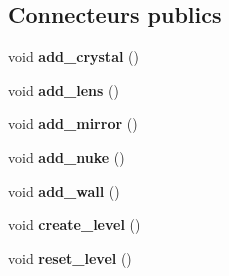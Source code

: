 \subsection*{Connecteurs publics}
\begin{DoxyCompactItemize}
\item 
\hypertarget{classElements_a964576c05a5b9ec733a663474f8fd978}{void {\bfseries add\+\_\+crystal} ()}\label{classElements_a964576c05a5b9ec733a663474f8fd978}

\item 
\hypertarget{classElements_a8093eca3330566813da371aecc96530c}{void {\bfseries add\+\_\+lens} ()}\label{classElements_a8093eca3330566813da371aecc96530c}

\item 
\hypertarget{classElements_a8d7a4e7ff0c84f105f0f0116425293a7}{void {\bfseries add\+\_\+mirror} ()}\label{classElements_a8d7a4e7ff0c84f105f0f0116425293a7}

\item 
\hypertarget{classElements_aa0884faf781bb26d6ca4dd8751b0eb32}{void {\bfseries add\+\_\+nuke} ()}\label{classElements_aa0884faf781bb26d6ca4dd8751b0eb32}

\item 
\hypertarget{classElements_ad4b05e8a07d9f6867035243c5e3f7572}{void {\bfseries add\+\_\+wall} ()}\label{classElements_ad4b05e8a07d9f6867035243c5e3f7572}

\item 
\hypertarget{classElements_ad4bfaa4ea43fffd8653224165b5bbc29}{void {\bfseries create\+\_\+level} ()}\label{classElements_ad4bfaa4ea43fffd8653224165b5bbc29}

\item 
\hypertarget{classElements_a938cdaf6c97d1c9e5db80280b6379176}{void {\bfseries reset\+\_\+level} ()}\label{classElements_a938cdaf6c97d1c9e5db80280b6379176}

\end{DoxyCompactItemize}
